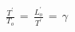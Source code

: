\documentclass[preview]{standalone}
\begin{document}
\begin{align*}
\frac{T^{'}}{T_{o}}\,=\,\frac{L^{'}_{o}}{T^{'}}\,=\,\gamma
\end{align*}
\end{document}
